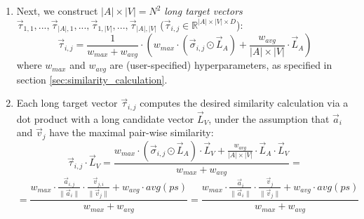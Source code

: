 \begin{enumerate}
    \item Next, we construct $|A| \times |V| = N^2$ \textit{long target vectors} $\vec{\tau}_{1, 1}, ..., \vec{\tau}_{|A|, 1}, ..., \vec{\tau}_{1, |V|}, ..., \vec{\tau}_{|A|, |V|}$ ($\vec{\tau}_{i, j} \in \mathbb{R}^{|A| \times |V| \times D}$):
    \begin{equation*}
        \vec{\tau}_{i, j} =
        \frac{1}{w_{max} + w_{avg}} \cdot \left (
        w_{max} \cdot (\vec{\sigma}_{i, j} \odot \vec{L}_{A}) 
        + \frac{w_{avg}}{|A| \times |V|} \cdot \vec{L}_{A}
        \right )
    \end{equation*}
    where $w_{max}$ and $w_{avg}$ are (user-specified) hyperparameters, as specified in section \ref{sec:similarity_calculation}.
    \item Each long target vector $\vec{\tau}_{i, j}$ computes the desired similarity calculation via a dot product with a long candidate vector $\vec{L}_V$, under the assumption that $\vec{a}_i$ and $\vec{v}_j$ have the maximal pair-wise similarity:
    \begin{equation*}
         \vec{\tau}_{i, j} \cdot \vec{L}_V = \frac{w_{max} \cdot (\vec{\sigma}_{i, j} \odot \vec{L}_{A}) \cdot \vec{L}_V + \frac{w_{avg}}{|A| \times |V|} \cdot \vec{L}_{A} \cdot \vec{L}_V}{w_{max} + w_{avg}} 
        = 
    \end{equation*}
    \begin{equation*}
        = 
        \frac{w_{max} \cdot \frac{\vec{a}_{i, j}}{\lVert \vec{a}_i \rVert} \cdot \frac{\vec{v}_{j, i}}{\lVert \vec{v}_j \rVert} + w_{avg} \cdot avg(ps)}{w_{max} + w_{avg}}
        = 
        \frac{w_{max} \cdot \frac{\vec{a}_{i}}{\lVert \vec{a}_i \rVert} \cdot \frac{\vec{v}_{j}}{\lVert \vec{v}_j \rVert} + w_{avg} \cdot avg(ps)}{w_{max} + w_{avg}}
    \end{equation*}
\end{enumerate}

